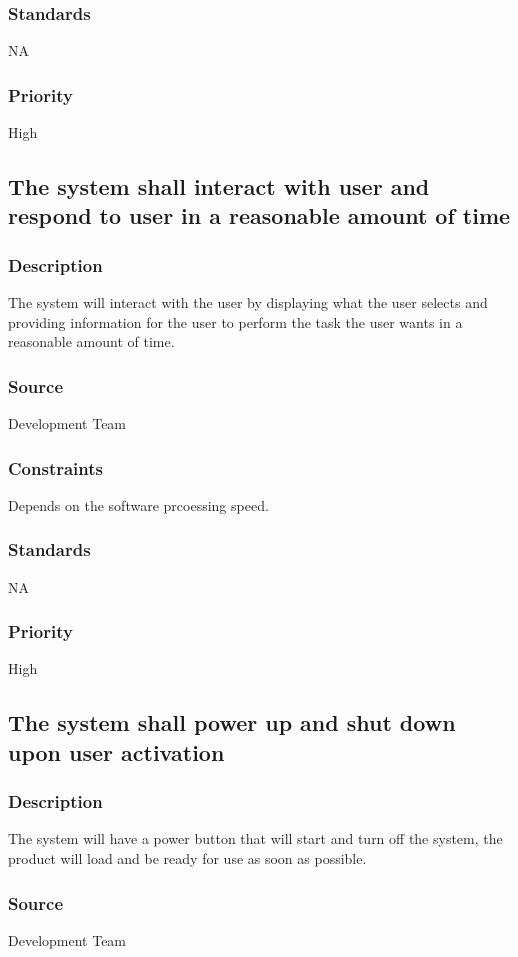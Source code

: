 \subsubsection{Standards}
NA
\subsubsection{Priority}
High

\subsection{The system shall interact with user and respond to user in a reasonable amount of time }
\subsubsection{Description}
The system will interact with the user by displaying what the user selects and providing information for the user to perform the task the user wants in a reasonable amount of time.
\subsubsection{Source}
Development Team
\subsubsection{Constraints}
Depends on the software prcoessing speed. 
\subsubsection{Standards}
NA
\subsubsection{Priority}
High

\subsection{The system shall power up and shut down upon user activation }
\subsubsection{Description}
The system will have a power button that will start and turn off the system, the product will load and be ready for use as soon as possible.
\subsubsection{Source}
Development Team
